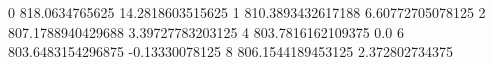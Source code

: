 0 818.0634765625 14.2818603515625
1 810.3893432617188 6.60772705078125
2 807.1788940429688 3.39727783203125
4 803.7816162109375 0.0
6 803.6483154296875 -0.13330078125
8 806.1544189453125 2.372802734375
